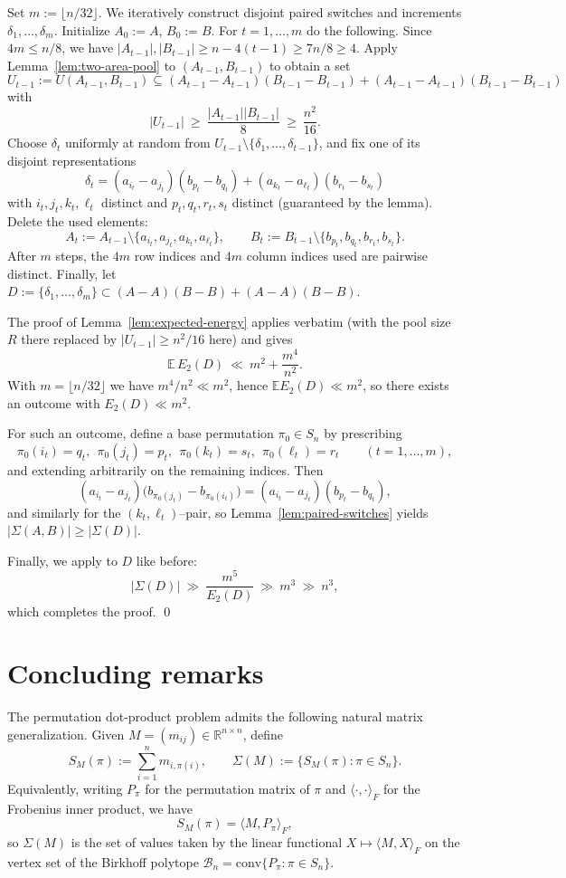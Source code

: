 \documentclass[12pt]{amsart}
\theoremstyle{definition}
\theoremstyle{remark}
\newcommand{\RR}{\mathbb{R}}
\newcommand{\EE}{\mathbb{E}}
\newcommand{\abs}[1]{\left|#1\right|}
\begin{document}
Set $m:=\lfloor n/32\rfloor$.  We iteratively construct disjoint paired switches and increments
$\delta_1,\dots,\delta_m$. Initialize $A_0:=A$, $B_0:=B$.  For $t=1,\dots,m$ do the following.
Since $4m\le n/8$, we have $|A_{t-1}|,|B_{t-1}|\ge n-4(t-1)\ge 7n/8\ge 4$.
Apply Lemma~\ref{lem:two-area-pool} to $(A_{t-1},B_{t-1})$ to obtain a set
\[
U_{t-1}:=U(A_{t-1},B_{t-1})\subseteq (A_{t-1}-A_{t-1})(B_{t-1}-B_{t-1})+(A_{t-1}-A_{t-1})(B_{t-1}-B_{t-1})
\]
with
\[
|U_{t-1}|\ \ge\ \frac{|A_{t-1}||B_{t-1}|}{8}\ \ge\ \frac{n^2}{16}.
\]
Choose $\delta_t$ uniformly at random from $U_{t-1}\setminus\{\delta_1,\dots,\delta_{t-1}\}$, and
fix one of its disjoint representations
\[
\delta_t=(a_{i_t}-a_{j_t})(b_{p_t}-b_{q_t})+(a_{k_t}-a_{\ell_t})(b_{r_t}-b_{s_t})
\]
with $i_t,j_t,k_t,\ell_t$ distinct and $p_t,q_t,r_t,s_t$ distinct (guaranteed by the lemma).
Delete the used elements:
\[
A_t:=A_{t-1}\setminus\{a_{i_t},a_{j_t},a_{k_t},a_{\ell_t}\},\qquad
B_t:=B_{t-1}\setminus\{b_{p_t},b_{q_t},b_{r_t},b_{s_t}\}.
\]
After $m$ steps, the $4m$ row indices and $4m$ column indices used are pairwise distinct. Finally, let $D:=\{\delta_1,\dots,\delta_m\} \subset (A-A)(B-B)+(A-A)(B-B)$.

The proof of Lemma~\ref{lem:expected-energy} applies verbatim
(with the pool size $R$ there replaced by $|U_{t-1}|\ge n^2/16$ here) and gives
\[
\EE\,E_2(D)\ \ll\ m^2+\frac{m^4}{n^2}.
\]
With $m=\lfloor n/32\rfloor$ we have $m^4/n^2\ll m^2$, hence $\EE E_2(D)\ll m^2$, so there exists an
outcome with $E_2(D)\ll m^2$.

For such an outcome, define a base permutation $\pi_0\in S_n$ by prescribing
\[
\pi_0(i_t)=q_t,\ \ \pi_0(j_t)=p_t,\ \ \pi_0(k_t)=s_t,\ \ \pi_0(\ell_t)=r_t
\qquad (t=1,\dots,m),
\]
and extending arbitrarily on the remaining indices.  Then
\[
(a_{i_t}-a_{j_t})\bigl(b_{\pi_0(j_t)}-b_{\pi_0(i_t)}\bigr)=(a_{i_t}-a_{j_t})(b_{p_t}-b_{q_t}),
\]
and similarly for the $(k_t,\ell_t)$--pair, so Lemma~\ref{lem:paired-switches} yields
$\abs{\Sigma(A,B)}\ge \abs{\Sigma(D)}$.

Finally, we apply  to $D$ like before:
\[
\abs{\Sigma(D)}\ \gg\ \frac{m^5}{E_2(D)}\ \gg\ m^3\ \gg\ n^3,
\]
which completes the proof.
    \qed

\section{Concluding remarks} \label{sec:conclusion}
The permutation dot-product problem admits the following natural matrix generalization.  Given
$M=(m_{ij})\in\RR^{n\times n}$, define
\[
S_M(\pi):=\sum_{i=1}^n m_{i,\pi(i)},\qquad
\Sigma(M):=\{S_M(\pi):\pi\in S_n\}.
\]
Equivalently, writing $P_\pi$ for the permutation matrix of $\pi$ and $\langle\cdot,\cdot\rangle_F$
for the Frobenius inner product, we have
\[
S_M(\pi)=\langle M,P_\pi\rangle_F,
\]
so $\Sigma(M)$ is the set of values taken by the linear functional $X\mapsto\langle M,X\rangle_F$
on the vertex set of the Birkhoff polytope $\mathcal{B}_n=\mathrm{conv}\{P_\pi:\pi\in S_n\}$.
\end{document}
